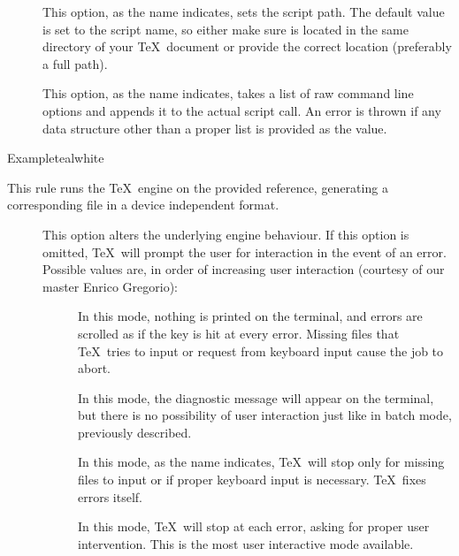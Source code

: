 \begin{description}
\begin{description}
\item[] This option, as the name indicates, sets the script path. The default value is set to the script name, so either make sure  is located in the same directory of your \TeX\ document or provide the correct location (preferably a full path).

\item[] This option, as the name indicates, takes a list of raw command line options and appends it to the actual script call. An error is thrown if any data structure other than a proper list is provided as the value.
\end{description}

\begin{codebox}{Example}{teal}{\icnote}{white}
\end{codebox}

\item[\rulebox{tex}]
This rule runs the  \TeX\ engine on the provided  reference, generating a corresponding file in a device independent format.

\begin{description}
\item[] This option alters the underlying engine behaviour. If this option is omitted, \TeX\ will prompt the user for interaction in the event of an error. Possible values are, in order of increasing user interaction (courtesy of our master Enrico Gregorio):

\begin{description}
\item[] In this mode, nothing is printed on the terminal, and errors are scrolled as if the  key is hit at every error. Missing files that \TeX\ tries to input or request from keyboard input cause the job to abort.

\item[] In this mode, the diagnostic message will appear on the terminal, but there is no possibility of user interaction just like in batch mode, previously described.

\item[] In this mode, as the name indicates, \TeX\ will stop only for missing files to input or if proper keyboard input is necessary. \TeX\ fixes errors itself.

\item[] In this mode, \TeX\ will stop at each error, asking for proper user intervention. This is the most user interactive mode available.
\end{description}


\end{description}
\end{description}
